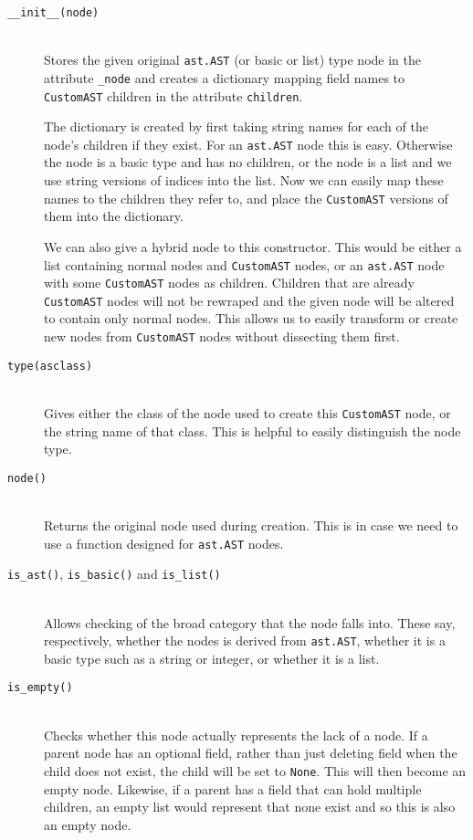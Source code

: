 \documentclass[twoside,a4paper]{report}
\begin{document}
\begin{description}
\item[\texttt{\_\_init\_\_(node)}] \hfill \\
Stores the given original \texttt{ast.AST} (or basic or list) type node in the attribute \texttt{\_node} and creates a dictionary mapping field names
to \texttt{CustomAST} children in the attribute \texttt{children}.

The dictionary is created by first taking string names for each of the node's children if they exist. For an \texttt{ast.AST} node this is easy.
Otherwise the node is a basic type and has no children, or the node is a list and we use string versions of indices into the list. Now we can
easily map these names to the children they refer to, and place the \texttt{CustomAST} versions of them into the dictionary.

We can also give a hybrid node to this constructor. This would be either a list containing normal nodes and \texttt{CustomAST} nodes, or an
\texttt{ast.AST} node with some \texttt{CustomAST} nodes as children. Children that are already \texttt{CustomAST} nodes will not be rewraped
and the given node will be altered to contain only normal nodes. This allows us to easily transform or create new nodes from \texttt{CustomAST}
nodes without dissecting them first.

\item[\texttt{type(asclass)}] \hfill \\
Gives either the class of the node used to create this \texttt{CustomAST} node, or the string name of that class. This is helpful to easily distinguish
the node type.

\item[\texttt{node()}] \hfill \\
Returns the original node used during creation. This is in case we need to use a function designed for \texttt{ast.AST} nodes.

\item[\texttt{is\_ast()}, \texttt{is\_basic()} and \texttt{is\_list()}] \hfill \\
Allows checking of the broad category that the node falls into. These say, respectively, whether the nodes is derived from \texttt{ast.AST}, whether
it is a basic type such as a string or integer, or whether it is a list.

\item[\texttt{is\_empty()}] \hfill \\
Checks whether this node actually represents the lack of a node. If a parent node has an optional field, rather than just deleting field when the child does
not exist, the child will be set to \texttt{None}. This will then become an empty node. Likewise, if a parent has a field that can hold multiple children, an
empty list would represent that none exist and so this is also an empty node.


\end{description}
\end{document}
